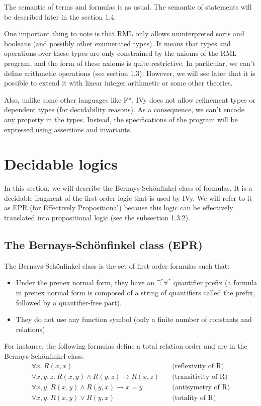 \documentclass[11pt,a4paper,oldfontcommands,openany]{memoir}
\begin{document}
    The semantic of terms and formulas is as usual. The semantic of statements will be described later in the section 1.4.

    One important thing to note is that RML only allows uninterpreted sorts and booleans (and possibly other enumerated types).
    It means that types and operations over these types are only constrained by the axioms of the RML program,
    and the form of these axioms is quite restrictive.
    In particular, we can't define arithmetic operations (see section 1.3).
    However, we will see later that it is possible to extend it with linear integer arithmetic or some other theories.

    Also, unlike some other languages like F*, IVy does not allow refinement types or dependent types (for decidability reasons).
    As a consequence, we can't encode any property in the types.
    Instead, the specifications of the program will be expressed using assertions and invariants.

    \section{Decidable logics}

    In this section, we will describe the Bernays-Schönfinkel class of formulas. It is a decidable fragment of the first order logic that is used by IVy.
    We will refer to it as EPR (for Effectively Propositional) because this logic can be effectively translated into propositional logic (see the subsection 1.3.2).

        \subsection{The Bernays-Schönfinkel class (EPR)}

        The Bernays-Schönfinkel class is the set of first-order formulas such that:
        \begin{itemize}
            \item Under the prenex normal form, they have an \(\exists^*\forall^*\) quantifier prefix
            (a formula in prenex normal form is composed of a string of quantifiers called the prefix, followed by a quantifier-free part).
            \item They do not use any function symbol (only a finite number of constants and relations).
        \end{itemize}

        For instance, the following formulas define a total relation order and are in the Bernays-Schönfinkel class:
        \begin{align*}
            \forall x. \ R(x,x) &\quad\text{(reflexivity of R)}\\
            \forall x,y,z. \ R(x,y) \land R(y,z) \rightarrow R(x,z) &\quad\text{(transitivity of R)}\\
            \forall x,y. \ R(x,y) \land R(y,x) \rightarrow x=y &\quad\text{(antisymetry of R)}\\
            \forall x,y. \ R(x,y) \lor R(y,x) &\quad\text{(totality of R)}
        \end{align*}
\end{document}
